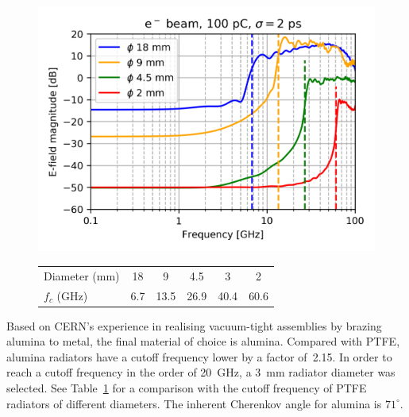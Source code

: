 \begin{figure}[!b]
\centering

\includegraphics[scale=1, keepaspectratio]{pictures/ptfe_size_scan.png}
\label{fig:cutoff_radiators}

\vspace{4mm}

\begin{tabular}{l c c c c c}
\toprule
Diameter (mm)   &  18&9&4.5&3&2\\
$f_c$ (GHz)     &   6.7&13.5&26.9&40.4&60.6\\
\bottomrule
\end{tabular}
\label{tab:cutoff_radiators}

\end{figure}

Based on CERN's experience in realising vacuum-tight assemblies by brazing alumina to metal, the final material of choice is alumina. Compared with PTFE, alumina radiators have a cutoff frequency lower by a factor of~2.15. In order to reach a cutoff frequency in the order of 20~GHz, a 3~mm radiator diameter was selected. See Table~\ref{tab:cutoff_radiators} for a comparison with the cutoff frequency of PTFE radiators of different diameters. The inherent Cherenkov angle for alumina is $71^\circ$.

